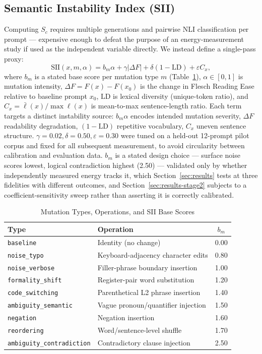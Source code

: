 \documentclass[conference]{IEEEtran}
\begin{document}
\subsection{Semantic Instability Index (SII)}
Computing $S_c$ requires multiple generations and pairwise NLI
classification per prompt --- expensive enough to defeat the purpose
of an energy-measurement study if used as the independent variable
directly. We instead define a single-pass proxy:
\begin{equation}
  \mathrm{SII}(x,m,\alpha) = b_m\alpha + \gamma|\Delta F| +
  \delta(1-\mathrm{LD}) + \varepsilon C_x,
  \label{eq:sii}
\end{equation}
where $b_m$ is a stated base score per mutation type $m$
(Table~\ref{tab:mutations}), $\alpha\in[0,1]$ is mutation intensity,
$\Delta F=F(x)-F(x_0)$ is the change in Flesch Reading
Ease~\cite{flesch1948readability} relative to baseline prompt $x_0$,
$\mathrm{LD}$ is lexical diversity (unique-token ratio), and
$C_x=\bar\ell(x)/\max\ell(x)$ is mean-to-max sentence-length ratio.
Each term targets a distinct instability source: $b_m\alpha$ encodes
intended mutation severity, $\Delta F$ readability degradation,
$(1-\mathrm{LD})$ repetitive vocabulary, $C_x$ uneven sentence
structure. $\gamma=0.02,\delta=0.50,\varepsilon=0.30$ were tuned on a
held-out 12-prompt pilot corpus and fixed for all subsequent
measurement, to avoid circularity between calibration and evaluation
data. $b_m$ is a stated design choice --- surface noise scores lowest,
logical contradiction highest (2.50) --- validated only by whether
independently measured energy tracks it, which
Section~\ref{sec:results} tests at three fidelities with different
outcomes, and Section~\ref{sec:results-stage2} subjects to a
coefficient-sensitivity sweep rather than asserting it is correctly
calibrated.
\begin{table}[t]
\caption{Mutation Types, Operations, and SII Base Scores}
\label{tab:mutations}
\centering
\setlength{\tabcolsep}{3.2pt}
\begin{tabular}{@{}llc@{}}
\toprule
\textbf{Type} & \textbf{Operation} & $b_m$ \\
\midrule
\texttt{baseline} & Identity (no change) & 0.00 \\
\texttt{noise\_typo} & Keyboard-adjacency character edits & 0.80 \\
\texttt{noise\_verbose} & Filler-phrase boundary insertion & 1.00 \\
\texttt{formality\_shift} & Register-pair word substitution & 1.20 \\
\texttt{code\_switching} & Parenthetical L2 phrase insertion & 1.40 \\
\texttt{ambiguity\_semantic} & Vague pronoun/quantifier injection & 1.50 \\
\texttt{negation} & Negation insertion & 1.60 \\
\texttt{reordering} & Word/sentence-level shuffle & 1.70 \\
\texttt{ambiguity\_contradiction} & Contradictory clause injection & 2.50 \\
\bottomrule
\end{tabular}
\end{table}
\end{document}
